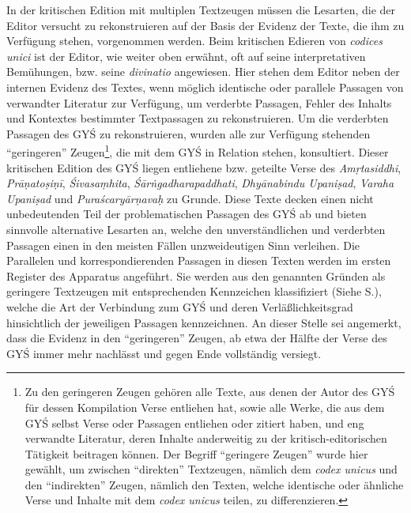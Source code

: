 \documentclass[a4paper,12pt]{article}
\begin{document}
{%

In der kritischen Edition mit multiplen Textzeugen müssen die Lesarten, die der Editor versucht zu rekonstruieren auf der Basis der Evidenz der Texte, die ihm zu Verfügung stehen, vorgenommen werden. Beim kritischen Edieren von \textit{codices unici} ist der Editor, wie weiter oben erwähnt, oft auf seine interpretativen Bemühungen, bzw. seine \textit{divinatio} angewiesen. Hier stehen dem Editor neben der internen Evidenz des Textes, wenn möglich identische oder parallele Passagen von verwandter Literatur zur Verfügung, um verderbte Passagen, Fehler des Inhalts und Kontextes bestimmter Textpassagen zu rekonstruieren. Um die verderbten Passagen des GYŚ zu rekonstruieren, wurden alle zur Verfügung stehenden ``geringeren'' Zeugen\footnote{Zu den geringeren Zeugen gehören alle Texte, aus denen der Autor des GYŚ für dessen Kompilation Verse entliehen hat, sowie alle Werke, die aus dem GYŚ selbst Verse oder Passagen entliehen oder zitiert haben, und eng verwandte Literatur, deren Inhalte anderweitig zu der kritisch-editorischen Tätigkeit beitragen können. Der Begriff ``geringere Zeugen'' wurde hier gewählt, um zwischen ``direkten'' Textzeugen, nämlich dem \textit{codex unicus} und den ``indirekten'' Zeugen, nämlich den Texten, welche identische oder ähnliche Verse und Inhalte mit dem \textit{codex unicus} teilen, zu differenzieren.}, die mit dem GYŚ in Relation stehen, konsultiert. Dieser kritischen Edition des GYŚ liegen entliehene bzw. geteilte Verse des \textit{Amṛtasiddhi}, \textit{Prāṇatoṣiṇī}, \textit{Śivasaṃhita}, \textit{Śārṅgadharapaddhati}, \textit{Dhyānabindu Upaniṣad}, \textit{Varaha Upaniṣad} und \textit{Puraścaryārṇavaḥ} zu Grunde. Diese Texte decken einen nicht unbedeutenden Teil der problematischen Passagen des GYŚ ab und bieten sinnvolle alternative Lesarten an, welche den unverständlichen und verderbten Passagen einen in den meisten Fällen unzweideutigen Sinn verleihen. Die Parallelen und korrespondierenden Passagen in diesen Texten werden im ersten Register des Apparatus angeführt. Sie werden aus den genannten Gründen als geringere Textzeugen mit entsprechenden Kennzeichen klassifiziert (Siehe S.\pageref{kennz}), welche die Art der Verbindung zum GYŚ und deren Verläßlichkeitsgrad hinsichtlich der jeweiligen Passagen kennzeichnen. An dieser Stelle sei angemerkt, dass die Evidenz in den ``geringeren'' Zeugen, ab etwa der Hälfte der Verse des GYŚ immer mehr nachlässt und gegen Ende vollständig versiegt.

}
\end{document}
